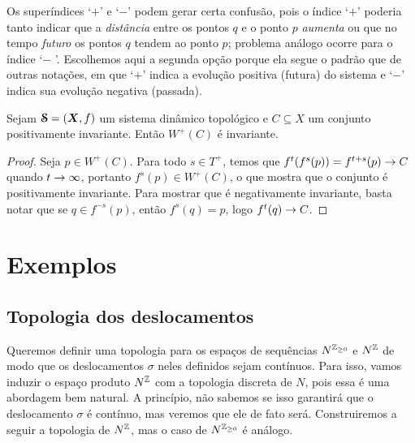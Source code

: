 Os superíndices `$+$' e `$-$' podem gerar certa confusão, pois o índice `$+$' poderia tanto indicar que a \textit{distância} entre os pontos $q$ e o ponto $p$ \textit{aumenta} ou que no tempo \textit{futuro} os pontos $q$ tendem ao ponto $p$; problema análogo ocorre para o índice `$-$	'. Escolhemos aqui a segunda opção porque ela segue o padrão que de outras notações, em que `$+$' indica a evolução positiva (futura) do sistema e `$-$' indica sua evolução negativa (passada).

\begin{proposition}
Sejam $\bm{\mathcal{S}}=(\bm X,f)$ um sistema dinâmico topológico e $C \subseteq X$ um conjunto positivamente invariante. Então $W^+(C)$ é invariante.
\end{proposition}
\begin{proof}
Seja $p \in W^+(C)$. Para todo $s \in T^+$, temos que $f^t(f^s(p)) = f^{t+s}(p) \rightarrow C$ quando $t \rightarrow \infty$, portanto $f^s(p) \in W^+(C)$, o que mostra que o conjunto é positivamente invariante. Para mostrar que é negativamente invariante, basta notar que se $q \in f^{-s}(p)$, então $f^s(q)=p$, logo $f^t(q) \rightarrow C$.
\end{proof}



\section{Exemplos}

\subsection{Topologia dos deslocamentos}

Queremos definir uma topologia para os espaços de sequências $N^{\mathbb{Z}_{\geq 0}}$ e $N^{\mathbb{Z}}$ de modo que os deslocamentos $\sigma$ neles definidos sejam contínuos. Para isso, vamos induzir o espaço produto $N^{\mathbb{Z}}$ com a topologia discreta de $N$, pois essa é uma abordagem bem natural. A princípio, não sabemos se isso garantirá que o deslocamento $\sigma$ é contínuo, mas veremos que ele de fato será. Construiremos a seguir a topologia de $N^{\mathbb{Z}}$, mas o caso de $N^{\mathbb{Z}_{\geq 0}}$ é análogo.

